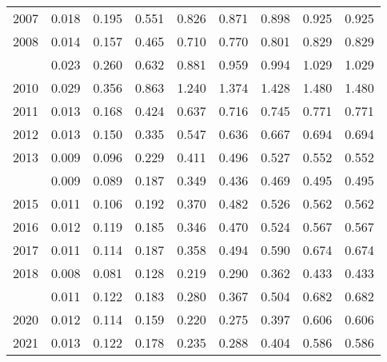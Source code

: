 \documentclass[
]{article}
\begin{document}
\begin{longtable}[t]{lrrrrrrrr}
2007 & 0.018 & 0.195 & 0.551 & 0.826 & 0.871 & 0.898 & 0.925 & 0.925\\
2008 & 0.014 & 0.157 & 0.465 & 0.710 & 0.770 & 0.801 & 0.829 & 0.829\\
\addlinespace
2009 & 0.023 & 0.260 & 0.632 & 0.881 & 0.959 & 0.994 & 1.029 & 1.029\\
2010 & 0.029 & 0.356 & 0.863 & 1.240 & 1.374 & 1.428 & 1.480 & 1.480\\
2011 & 0.013 & 0.168 & 0.424 & 0.637 & 0.716 & 0.745 & 0.771 & 0.771\\
2012 & 0.013 & 0.150 & 0.335 & 0.547 & 0.636 & 0.667 & 0.694 & 0.694\\
2013 & 0.009 & 0.096 & 0.229 & 0.411 & 0.496 & 0.527 & 0.552 & 0.552\\
\addlinespace
2014 & 0.009 & 0.089 & 0.187 & 0.349 & 0.436 & 0.469 & 0.495 & 0.495\\
2015 & 0.011 & 0.106 & 0.192 & 0.370 & 0.482 & 0.526 & 0.562 & 0.562\\
2016 & 0.012 & 0.119 & 0.185 & 0.346 & 0.470 & 0.524 & 0.567 & 0.567\\
2017 & 0.011 & 0.114 & 0.187 & 0.358 & 0.494 & 0.590 & 0.674 & 0.674\\
2018 & 0.008 & 0.081 & 0.128 & 0.219 & 0.290 & 0.362 & 0.433 & 0.433\\
\addlinespace
2019 & 0.011 & 0.122 & 0.183 & 0.280 & 0.367 & 0.504 & 0.682 & 0.682\\
2020 & 0.012 & 0.114 & 0.159 & 0.220 & 0.275 & 0.397 & 0.606 & 0.606\\
2021 & 0.013 & 0.122 & 0.178 & 0.235 & 0.288 & 0.404 & 0.586 & 0.586\\*
\end{longtable}
\end{document}
